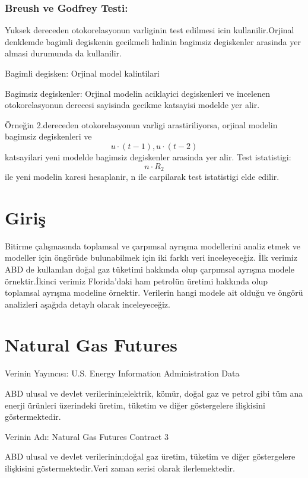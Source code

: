 \documentclass[11pt]{article}
\begin{document}
\subsubsection{Breush ve Godfrey Testi:}\label{breush-ve-godfrey-testi}

Yuksek dereceden otokorelasyonun varliginin test edilmesi icin
kullanilir.Orjinal denklemde bagimli degiskenin gecikmeli halinin
bagimsiz degiskenler arasinda yer almasi durumunda da kullanilir.

Bagimli degisken: Orjinal model kalintilari

Bagimsiz degiskenler: Orjinal modelin aciklayici degiskenleri ve
incelenen otokorelasyonun derecesi sayisinda gecikme katsayisi modelde
yer alir.

Örneğin 2.dereceden otokorelasyonun varligi arastiriliyorsa, orjinal
modelin bagimsiz degiskenleri ve \[ u\cdot (t-1), u\cdot (t-2) \]
katsayilari yeni modelde bagimsiz degiskenler arasinda yer alir. Test
istatistigi: \[ n \cdot R{_2} \] ile yeni modelin karesi hesaplanir, n
ile carpilarak test istatistigi elde edilir.
\pagebreak
    \section{Giriş}\label{giriux15f}

Bitirme çalışmasında toplamsal ve çarpımsal ayrışma modellerini analiz
etmek ve modeller için öngörüde bulunabilmek için iki farklı veri
inceleyeceğiz. İlk verimiz ABD de kullanılan doğal gaz tüketimi hakkında
olup çarpımsal ayrışma modele örnektir.İkinci verimiz Florida'daki ham
petrolün üretimi hakkında olup toplamsal ayrışma modeline örnektir.
Verilerin hangi modele ait olduğu ve öngörü analizleri aşağıda detaylı
olarak inceleyeceğiz.

\section{Natural Gas Futures}\label{natural-gas-futures}

Verinin Yayıncısı: U.S. Energy Information Administration Data

ABD ulusal ve devlet verilerinin;elektrik, kömür, doğal gaz ve petrol
gibi tüm ana enerji ürünleri üzerindeki üretim, tüketim ve diğer
göstergelere ilişkisini göstermektedir.

Verinin Adı: Natural Gas Futures Contract 3

ABD ulusal ve devlet verilerinin;doğal gaz üretim, tüketim ve diğer
göstergelere ilişkisini göstermektedir.Veri zaman serisi olarak
ilerlemektedir.
\end{document}
